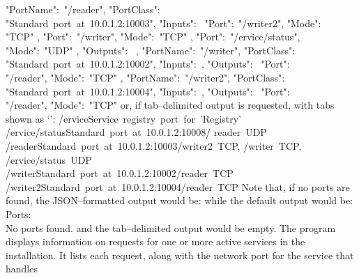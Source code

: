 \textbraceleft{} "PortName":\ "/reader", "PortClass":\ \\
"Standard~port~at~10.0.1.2:10003", "Inputs":\ \openSq{} \textbraceleft{} "Port":\
"/writer2", "Mode":\ \\
"TCP" \textbraceright{}, \textbraceleft{} "Port":\ "/writer", "Mode":\ "TCP"
\textbraceright, \textbraceleft{} "Port":\ "/\textdollar{}ervice/status",\\
"Mode":\ "UDP" \textbraceright{} \closeSq, "Outputs":\ \sqPair{} \textbraceright,
\textbraceleft{} "PortName":\ "/writer", "PortClass":\ \\
"Standard~port~at~10.0.1.2:10002", "Inputs":\ \sqPair, "Outputs":\ \openSq{}
\textbraceleft{} "Port":\ \\
"/reader", "Mode":\ "TCP" \textbraceright{} \closeSq{} \textbraceright{},
\textbraceleft{} "PortName":\ "/writer2", "PortClass":\ \\
"Standard~port~at~10.0.1.2:10004", "Inputs":\ \sqPair, "Outputs":\ \openSq{}
\textbraceleft{} "Port":\ \\
"/reader", "Mode":\ "TCP" \textbraceright{} \closeSq{} \textbraceright{} \closeSq
\outputEnd{}
or, if tab--delimited output is requested, with tabs shown as
`\texttt{\boldmath{$\vdash$}}':
\outputBegin{}
/\textdollar{}ervice\pseudotab{}Service~registry~port~for~'Registry'\\		
/\textdollar{}ervice/status\pseudotab{}Standard~port~at~10.0.1.2:10008\pseudotab/%
reader~UDP\\
/reader\pseudotab{}Standard~port~at~10.0.1.2:10003\pseudotab/writer2~TCP,
/writer~TCP,\\
\hspace*{2em}/\textdollar{}ervice/status~UDP\\
/writer\pseudotab{}Standard~port~at~10.0.1.2:10002\pseudotab/reader~TCP\\
/writer2\pseudotab{}Standard~port~at~10.0.1.2:10004\pseudotab/reader~TCP
\outputEnd{}
Note that, if no ports are found, the JSON--formatted output would be:
\outputBegin{}
\sqPair
\outputEnd{}
while the default output would be:
\outputBegin{}
Ports:\\
\settowidth{\utilLen}{Por}%
\hspace*{\utilLen}No ports found.
\outputEnd{}
and the tab--delimited output would be empty.
The program  displays information on requests for one or more
active services in the \mplusm{} installation.
It lists each request, along with the \yarp{} network port for the service that handles

